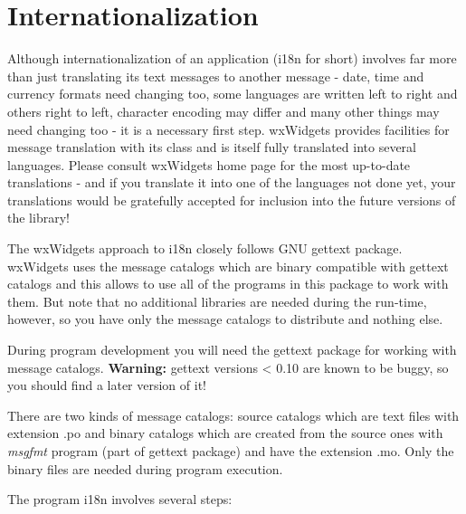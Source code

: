 \section{Internationalization}\label{internationalization}

Although internationalization of an application (i18n for short) involves far
more than just translating its text messages to another message - date, time and
currency formats need changing too, some languages are written left to right
and others right to left, character encoding may differ and many other things
may need changing too - it is a necessary first step. wxWidgets provides
facilities for message translation with its 
 class and is itself fully translated into several
languages. Please consult wxWidgets home page for the most up-to-date
translations - and if you translate it into one of the languages not done
yet, your translations would be gratefully accepted for inclusion into the
future versions of the library!

The wxWidgets approach to i18n closely follows GNU gettext package. wxWidgets uses the
message catalogs which are binary compatible with gettext catalogs and this
allows to use all of the programs in this package to work with them. But note
that no additional libraries are needed during the run-time, however, so you
have only the message catalogs to distribute and nothing else.

During program development you will need the gettext package for
working with message catalogs. {\bf Warning:} gettext versions < 0.10 are known
to be buggy, so you should find a later version of it!

There are two kinds of message catalogs: source catalogs which are text files
with extension .po and binary catalogs which are created from the source ones
with {\it msgfmt} program (part of gettext package) and have the extension .mo.
Only the binary files are needed during program execution.

The program i18n involves several steps:

